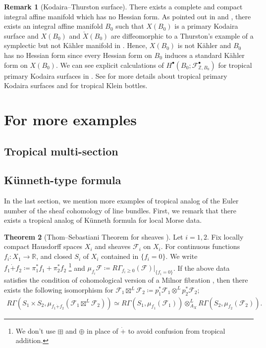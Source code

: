 \documentclass[a4paper,dvipdfmx,reqno,12pt]{amsart}
\theoremstyle{definition}
\newtheorem{theorem}{Theorem}[section]
\newtheorem{remark}[theorem]{Remark}
\newcommand{\deq}{\coloneqq}
\newcommand{\mcal}[1]{\mathcal{#1}}%
\newcommand{\myfootnote}[1]{\hspace{-5pt}\footnote{#1}}
\numberwithin{equation}{section}
\begin{document}
\begin{remark}[{Kodaira--Thurston surface}]
There exists a complete and compact integral affine manifold
  which has no Hessian form.
As pointed out in \cite[Example 1.14]{grossMirrorSymmetryLogarithmic2006a}
and \cite[p.403]{MR1461965}, there exists an integral affine manifold
$B_0$ such that
$X(B_0)$ is a primary Kodaira surface and $X(B_0)$
and $\check{X}(B_0)$
are diffeomorphic to a Thurston's example of a symplectic but
not K\"ahler manifold in \cite{MR402764}.
Hence, $X(B_0)$ is not K\"ahler and $B_0$ has no
Hessian form since every Hessian form on $B_0$ induces a 
standard K\"ahler form
on $X(B_0)$.
We can see explicit calculations of 
$H^{\bullet}(B_0;\mathcal{F}_{\mathbb{Z},B_0}^{\bullet})$
for tropical primary Kodaira surfaces in \cite{maehara2023}.
See \cite{MR1422337} for more details about tropical 
primary Kodaira surfaces and 
\cite{MR3079343,MR3894860} for tropical Klein bottles.

\end{remark}

\section{For more examples}

\subsection{Tropical multi-section}
\label{section-tropical-multi-section}

\subsection{K\"unneth-type formula}


In the last section, we mention more examples of 
tropical analog of the Euler number of 
the sheaf cohomology of line bundles.
First, we remark that there exists
a tropical analog of K\"unneth formula for 
local Morse data.

\begin{theorem}[{Thom--Sebastiani Theorem for sheaves \cite[Theorem 1.2.2]{MR2031639}}]
Let $i=1,2$.
Fix locally compact Hausdorff spaces $X_i$ and 
sheaves $\mathcal{F}_i$ on $X_i$.
For continuous functions $f_i\colon X_1 \to\mathbb{R}$,
and closed $S_i$ of $X_i$ contained in $\{f_i=0\}$.
We write $f_1\dot{+} f_2\deq \pi_1^{*}f_1+\pi_2^{*}f_2$
\myfootnote{
We don't use $\boxplus$ and $\oplus$ in place of
$\dot{+}$
to avoid confusion from tropical addition.}
and 
$\mu_{f_i}\mathcal{F}\deq R\Gamma_{f_i\geq 0}
(\mathcal{F})|_{\{f_i=0\}}$.
If the above data satisfies
the condition of cohomological version of a Milnor 
fibration \cite[Assumption 1.1.1]{MR2031639},
then there exists the following isomorphism 
for $\mcal{F}_1\boxtimes^{L} \mcal{F}_2\deq 
p_1^{*}\mcal{F}_1\otimes^{L}p^{*}_2\mcal{F}_2$;
\begin{align}
    R\Gamma(S_1\times S_2,\mu_{f_1\dot{+}f_2}(\mcal{F}_1\boxtimes^{L} \mcal{F}_2))
    \simeq R\Gamma(S_1,\mu_{f_1}(\mcal{F}_1))
    \otimes^{L}_{A_X}R\Gamma(S_2,\mu_{f_2}(\mcal{F}_2)).
\end{align}

\end{theorem}
\end{document}
